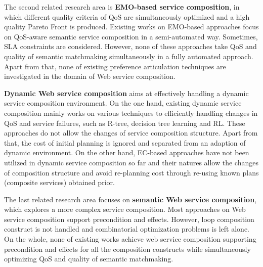 
The second related research area is \textbf{EMO-based service composition}, in which different quality criteria of QoS are simultaneously optimized and a high quality Pareto Front is produced. Existing works on EMO-based approaches focus on QoS-aware semantic service composition in a semi-automated way. Sometimes, SLA constraints are considered. However, none of these approaches take QoS and quality of semantic matchmaking simultaneously in a fully automated approach. Apart from that, none of existing preference articulation techniques are investigated in the domain of Web service composition.

\textbf{Dynamic Web service composition} aims at effectively handling a dynamic service composition environment. On the one hand, existing dynamic service composition mainly works on various techniques to efficiently handling changes in QoS and service failures, such as R-tree, decision tree learning and RL. These approaches do not allow the changes of service composition structure. Apart from that, the cost of initial planning is ignored and separated from an adaption of dynamic environment. On the other hand, EC-based approaches have not been utilized in dynamic service composition so far and their natures allow the changes of composition structure and avoid re-planning cost through re-using known plans (composite services) obtained prior. 


The last related research area focuses on \textbf{semantic Web service composition}, which explores a more complex service composition. Most approaches on Web service composition support precondition and effects. However, loop composition construct is not handled and combinatorial optimization problems is left alone. On the whole, none of existing works achieve web service composition supporting precondition and effects for all the composition constructs while simultaneously  optimizing QoS and quality of semantic matchmaking.
